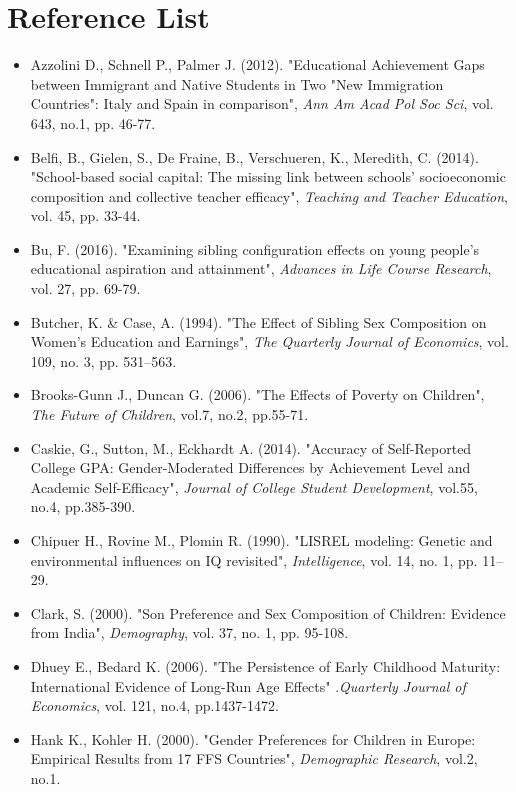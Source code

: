 \documentclass[12pt]{article}
\begin{document}
\section{Reference List}
\begin{itemize}
 
    \item Azzolini D., Schnell P., Palmer J. (2012). "Educational Achievement Gaps between Immigrant and Native Students in Two "New Immigration Countries": Italy and Spain in comparison", \textit{Ann Am Acad Pol Soc Sci}, vol. 643, no.1, pp. 46-77.
    \item Belfi, B., Gielen, S., De Fraine, B., Verschueren, K., Meredith, C. (2014). "School-based social capital: The missing link between schools’ socioeconomic composition and collective teacher efficacy", \textit{Teaching and Teacher Education}, vol. 45, pp. 33-44.
    \item Bu, F. (2016). "Examining sibling configuration effects on young people's educational aspiration and attainment", \textit{Advances in Life Course Research}, vol. 27, pp. 69-79.
    \item Butcher, K. \& Case, A. (1994). "The Effect of Sibling Sex Composition on Women's Education and Earnings", \textit{The Quarterly Journal of Economics}, vol. 109, no. 3, pp. 531–563.
    \item Brooks-Gunn J., Duncan G. (2006). "The Effects of Poverty on Children", \textit{The Future of Children}, vol.7, no.2, pp.55-71.
    \item Caskie, G., Sutton, M., Eckhardt A. (2014). "Accuracy of Self-Reported College GPA: Gender-Moderated Differences by Achievement Level and Academic Self-Efficacy", \textit{Journal of College Student Development}, vol.55, no.4, pp.385-390.
    \item Chipuer H., Rovine M., Plomin R. (1990). "LISREL modeling: Genetic and environmental influences on IQ revisited", \textit{Intelligence}, vol. 14, no. 1, pp. 11–29.
    \item Clark, S. (2000). "Son Preference and Sex Composition of Children: Evidence from India", \textit{Demography}, vol. 37, no. 1, pp. 95-108.
    \item Dhuey E., Bedard K. (2006). "The Persistence of Early Childhood Maturity: International Evidence of Long-Run Age Effects" .\textit{Quarterly Journal of Economics}, vol. 121, no.4, pp.1437-1472.
    \item Hank K., Kohler H. (2000). "Gender Preferences for Children in Europe: Empirical Results from 17 FFS Countries", \textit{Demographic Research}, vol.2, no.1.

\end{itemize}
\end{document}

